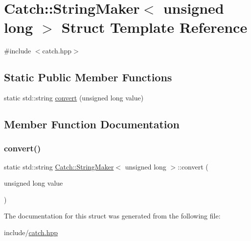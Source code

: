 \hypertarget{struct_catch_1_1_string_maker_3_01unsigned_01long_01_4}{}\section{Catch\+::String\+Maker$<$ unsigned long $>$ Struct Template Reference}
\label{struct_catch_1_1_string_maker_3_01unsigned_01long_01_4}


{\ttfamily \#include $<$catch.\+hpp$>$}

\subsection*{Static Public Member Functions}
\begin{DoxyCompactItemize}
\item 
static std\+::string \mbox{\hyperlink{struct_catch_1_1_string_maker_3_01unsigned_01long_01_4_ae105dc97e4462a86a61b59667f8423c9}{convert}} (unsigned long value)
\end{DoxyCompactItemize}


\subsection{Member Function Documentation}
\mbox{\label{struct_catch_1_1_string_maker_3_01unsigned_01long_01_4_ae105dc97e4462a86a61b59667f8423c9}} 
\subsubsection{\texorpdfstring{convert()}{convert()}}
{\footnotesize\ttfamily static std\+::string \mbox{\hyperlink{struct_catch_1_1_string_maker}{Catch\+::\+String\+Maker}}$<$ unsigned long $>$\+::convert (\begin{DoxyParamCaption}\item[{unsigned long}]{value }\end{DoxyParamCaption})\hspace{0.3cm}{\ttfamily [static]}}



The documentation for this struct was generated from the following file\+:\begin{DoxyCompactItemize}
\item 
include/\mbox{\hyperlink{catch_8hpp}{catch.\+hpp}}\end{DoxyCompactItemize}
